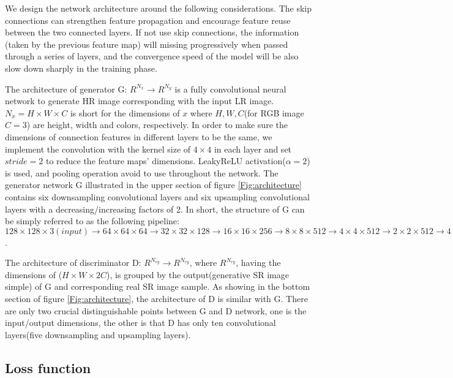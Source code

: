 \documentclass[conference,compsoc]{IEEEtran}
\begin{document}
We design the network architecture around the following considerations. The skip connections can strengthen feature propagation and encourage feature reuse between the two connected layers. If not use skip connections, the information (taken by the previous feature map) will missing progressively when passed through a series of layers, and the convergence speed of the model will be also slow down sharply in the training phase.

The architecture of generator G: $R^{N_x} \rightarrow R^{N_y}$ is a fully convolutional neural network to generate HR image corresponding with the input LR image. $N_x = H\times W \times C$ is short for the dimensions of $x$ where $H,W,C$(for RGB image $C=3$) are height, width and colors, respectively. In order to make sure the dimensions of connection features in different layers to be the same, we implement the convolution with the kernel size of $4\times4$ in each layer and set $stride = 2$  to reduce the feature maps' dimensions. LeakyReLU activation($\alpha = 2$) is used, and pooling operation avoid to use throughout the network. The generator network G illustrated in the upper section of figure \ref{Fig:architecture} contains six downsampling convolutional layers and six upsampling convolutional layers with a decreasing/increasing factors of 2. In short, the structure of G can be simply referred to as the following pipeline: $128\times128\times3(input)\rightarrow 64\times64\times64 \rightarrow 32\times32\times128 \rightarrow 16\times16\times256 \rightarrow 8\times8\times512 \rightarrow 4\times4\times512 \rightarrow 2\times2\times512 \rightarrow 4\times4\times1024 \rightarrow 8\times8\times1024 \rightarrow 16\times16\times512 \rightarrow 32\times32\times256 \rightarrow 64\times64\times128 \rightarrow 128\times128\times3(output)$.

The architecture of discriminator D: $R^{N_{ry}} \rightarrow R^{N_{ry}}$, where $R^{N_{ry}}$, having the dimensions of ($H \times W \times 2C$), is grouped by the output(generative SR image simple) of G and corresponding real SR image sample. As showing in the bottom section of figure \ref{Fig:architecture}, the architecture of D is similar with G. There are only two crucial distinguishable points between G and D network, one is the input/output dimensions, the other is that D has only ten convolutional layers(five downsampling and upsampling layers).



\subsection{Loss function}
\end{document}

